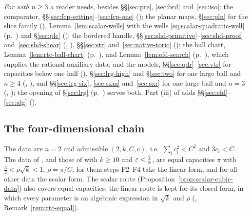 \emph{For  with $n\ge3$} a reader needs, besides \S\S\ref{sec:pre}, \ref{sec:brd} and~\ref{sec:iso}:
the comparator, \S\S\ref{sec:fcp-setting}--\ref{sec:fcp-one} (); the planar maps, \S\ref{sec:pln}
for the slice family (), Lemma~\ref{lem:scalar-wells} with the wells \eqref{eq:scalar-quadratic-well}
(p.~\pageref{lem:scalar-wells}) and \S\ref{sec:plc} (); the bordered handle,
\S\S\ref{sec:shd-primitive}--\ref{sec:shd-proof} and~\ref{sec:shd-shear} (,
), \S\S\ref{sec:str} and~\ref{sec:native-toric} (); the ball chart,
Lemma~\ref{lem:rtc-ball-chart} (p.~\pageref{lem:rtc-ball-chart}), and Lemma~\ref{lem:efd-search}
(p.~\pageref{lem:efd-search}), which supplies the rational auxiliary data; and the models,
\S\S\ref{sec:qdr}--\ref{sec:vtr} for capacities below one half (), \S\ref{sec:lrg-high}
and \S\ref{sec:two} for one large ball and $n\ge4$ (, ), and
\S\S\ref{sec:lrg-six}, \ref{sec:sxm} and~\ref{sec:sxr} for one large ball and $n=3$ (,
); the opening of \S\ref{sec:lrg} (p.~\pageref{sec:lrg}) serves both. Part (iii) of
 adds \S\S\ref{sec:efd}--\ref{sec:alg} ().

\subsection{The four-dimensional chain}\label{sec:guide-four}

The data are $n=2$ and admissible $(2,k,C,c)$, i.e.\ $\sum_ic_i^2<C^2$ and $3c_i<C$. The data of
, and those of  with $k\ge10$ and $\varepsilon<\frac78$, are equal
capacities $\pi$ with $\frac34<\rho\sqrt k<1$, $\rho=\pi/C$; for them steps F2--F4 take the linear form, and for all
other data the scalar form. The scalar route (Proposition~\ref{prop:scalar-cubic-data}) also covers equal capacities;
the linear route is kept for its closed form, in which every parameter is an algebraic expression in $\sqrt k$ and
$\rho$ (, Remark~\ref{rem:rtc-equal}).

